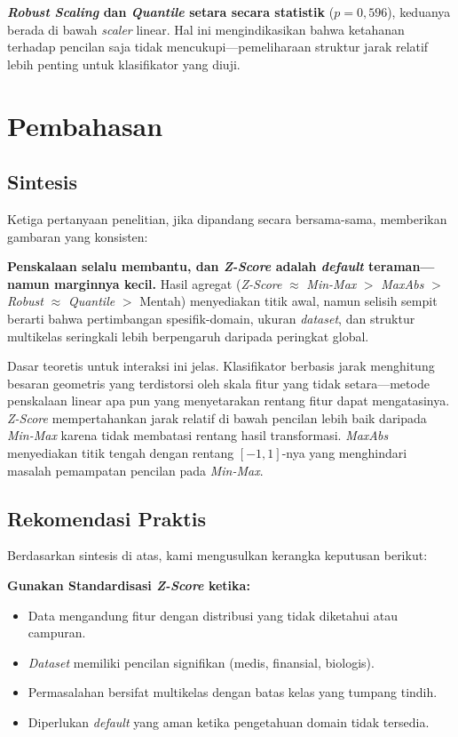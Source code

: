 \documentclass[12pt,a4paper]{article}
\begin{document}
\textbf{\textit{Robust Scaling} dan \textit{Quantile} setara secara statistik}
($p = 0,596$), keduanya berada di bawah \textit{scaler} linear. Hal ini
mengindikasikan bahwa ketahanan terhadap pencilan saja tidak mencukupi---pemeliharaan
struktur jarak relatif lebih penting untuk klasifikator yang diuji.

\section{Pembahasan}
\label{sec:discussion}

\subsection{Sintesis}
\label{sec:synthesis}

Ketiga pertanyaan penelitian, jika dipandang secara bersama-sama, memberikan
gambaran yang konsisten:

\textbf{Penskalaan selalu membantu, dan \textit{Z-Score} adalah \textit{default}
teraman---namun marginnya kecil.} Hasil agregat (\textit{Z-Score} $\approx$
\textit{Min-Max} $>$ \textit{MaxAbs} $>$ \textit{Robust} $\approx$
\textit{Quantile} $>$ Mentah) menyediakan titik awal, namun selisih sempit
berarti bahwa pertimbangan spesifik-domain, ukuran \textit{dataset}, dan
struktur multikelas seringkali lebih berpengaruh daripada peringkat global.

Dasar teoretis untuk interaksi ini jelas. Klasifikator berbasis jarak menghitung
besaran geometris yang terdistorsi oleh skala fitur yang tidak setara---metode
penskalaan linear apa pun yang menyetarakan rentang fitur dapat mengatasinya.
\textit{Z-Score} mempertahankan jarak relatif di bawah pencilan lebih baik
daripada \textit{Min-Max} karena tidak membatasi rentang hasil transformasi.
\textit{MaxAbs} menyediakan titik tengah dengan rentang $[-1, 1]$-nya yang
menghindari masalah pemampatan pencilan pada \textit{Min-Max}.

\subsection{Rekomendasi Praktis}
\label{sec:recommendations}

Berdasarkan sintesis di atas, kami mengusulkan kerangka keputusan berikut:

\textbf{Gunakan Standardisasi \textit{Z-Score} ketika:}
\begin{itemize}
  \item Data mengandung fitur dengan distribusi yang tidak diketahui atau
  campuran.
  \item \textit{Dataset} memiliki pencilan signifikan (medis, finansial, biologis).
  \item Permasalahan bersifat multikelas dengan batas kelas yang tumpang tindih.
  \item Diperlukan \textit{default} yang aman ketika pengetahuan domain tidak
  tersedia.
\end{itemize}
\end{document}
